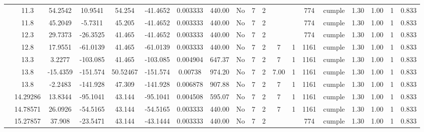 \begin{table}[H]
{\begin{tabular}{|c|c|c|c|c|c|r|c|c|c|c|c|c|c|c|c|c|c|c|}
\cline{2-19}    & 11.3 & 54.2542 & 10.9541 & 54.254 & -41.4652 & \multicolumn{1}{c|}{0.003333} & 440.00 & No  & 7   & 2   &     &     & 774 & \cellcolor[rgb]{ .776,  .937,  .808}\textcolor[rgb]{ 0,  .38,  0}{cumple} & 1.30 & 1.00 & 1   & 0.833 \bigstrut\\
\cline{2-19}    & 11.8 & 45.2049 & -5.7311 & 45.205 & -41.4652 & 0.003333 & 440.00 & No  & 7   & 2   &     &     & 774 & \cellcolor[rgb]{ .776,  .937,  .808}cumple & 1.30 & 1.00 & 1   & 0.833 \bigstrut\\
\cline{2-19}    & 12.3 & 29.7373 & -26.3525 & 41.465 & -41.4652 & 0.003333 & 440.00 & No  & 7   & 2   &     &     & 774 & \cellcolor[rgb]{ .776,  .937,  .808}cumple & 1.30 & 1.00 & 1   & 0.833 \bigstrut\\
\cline{2-19}    & 12.8 & 17.9551 & -61.0139 & 41.465 & -61.0139 & 0.003333 & 440.00 & No  & 7   & 2   & 7   & 1   & 1161 & \cellcolor[rgb]{ .776,  .937,  .808}cumple & 1.30 & 1.00 & 1   & 0.833 \bigstrut\\
\cline{2-19}    & 13.3 & 3.2277 & -103.085 & 41.465 & -103.085 & 0.004904 & 647.37 & No  & 7   & 2   & 7   & 1   & 1161 & \cellcolor[rgb]{ .776,  .937,  .808}cumple & 1.30 & 1.00 & 1   & 0.833 \bigstrut\\
\cline{2-19}    & \cellcolor[rgb]{ .851,  .882,  .949}13.8 & -15.4359 & -151.574 & 50.52467 & -151.574 & \multicolumn{1}{c|}{0.00738} & 974.20 & No  & 7   & 2   & 7.00 & 1   & 1161 & \cellcolor[rgb]{ .776,  .937,  .808}\textcolor[rgb]{ 0,  .38,  0}{cumple} & 1.30 & 1.00 & 1   & 0.833 \bigstrut\\
\cline{2-19}    & \cellcolor[rgb]{ .851,  .882,  .949}13.8 & -2.2483 & -141.928 & 47.309 & -141.928 & 0.006878 & 907.88 & No  & 7   & 2   & 7   & 1   & 1161 & \cellcolor[rgb]{ .776,  .937,  .808}cumple & 1.30 & 1.00 & 1   & 0.833 \bigstrut\\
\cline{2-19}    & 14.29286 & 13.8344 & -95.1041 & 43.144 & -95.1041 & 0.004508 & 595.07 & No  & 7   & 2   & 7   & 1   & 1161 & \cellcolor[rgb]{ .776,  .937,  .808}cumple & 1.30 & 1.00 & 1   & 0.833 \bigstrut\\
\cline{2-19}    & 14.78571 & 26.0926 & -54.5165 & 43.144 & -54.5165 & 0.003333 & 440.00 & No  & 7   & 2   & 7   & 1   & 1161 & \cellcolor[rgb]{ .776,  .937,  .808}cumple & 1.30 & 1.00 & 1   & 0.833 \bigstrut\\
\cline{2-19}    & 15.27857 & 37.908 & -23.5471 & 43.144 & -43.1444 & 0.003333 & 440.00 & No  & 7   & 2   &     &     & 774 & \cellcolor[rgb]{ .776,  .937,  .808}cumple & 1.30 & 1.00 & 1   & 0.833 \bigstrut\\

\end{tabular}}
\end{table}
